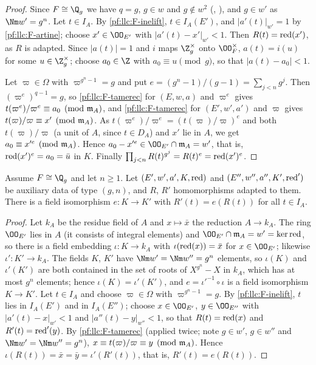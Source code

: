 \begin{proof}
Since $F\cong\Q_g$ we have $q=g$, $g\in w$ and $g\notin w^2$
(,
), and $g\in w'$ as $\Nm w'=g^n$. Let $t\in I_A$. By
\ref{pf:llc:F-inelift}, $t\in I_A(E')$, and $|a'(t)|_{w'}=1$ by \ref{pf:llc:F-artine}; choose
$x'\in\OO_{E'}$ with $|a'(t)-x'|_{w'}<1$. Then $R(t)=\operatorname{red}(x')$, as $R$ is adapted. Since $|a(t)|=1$ and $i$
maps $\Z_g^\times$ onto $\OO_F^\times$, $a(t)=i(u)$ for some $u\in\Z_g^\times$; choose $a_0\in\Z$ with $a_0\equiv
u\pmod g$, so that $|a(t)-a_0|<1$.

Let $\varpi\in\Omega$ with $\varpi^{g^n-1}=g$ and put $e=(g^n-1)/(g-1)=\sum_{j<n}g^j$. Then
$(\varpi^e)^{q-1}=g$, so \ref{pf:llc:F-tamerec} for $(E,w,a)$ and $\varpi^e$ gives
$t(\varpi^e)/\varpi^e\equiv a_0\pmod{\mathfrak m_A}$, and \ref{pf:llc:F-tamerec} for $(E',w',a')$ and $\varpi$ gives
$t(\varpi)/\varpi\equiv x'\pmod{\mathfrak m_A}$. As $t(\varpi^e)/\varpi^e=(t(\varpi)/\varpi)^e$ and both $t(\varpi)/\varpi$
(a unit of $A$, since $t\in D_A$) and $x'$ lie in $A$, we get $a_0\equiv x'^e\pmod{\mathfrak m_A}$. Hence
$a_0-x'^e\in\OO_{E'}\cap\llcm_A=w'$, that is, $\operatorname{red}(x')^e=a_0=\bar u$ in $K$. Finally
$\prod_{j<n}R(t)^{g^j}=R(t)^e=\operatorname{red}(x')^e$.
\end{proof}

\begin{lemma}\label{pf:llc:resindep}
Assume $F\cong\Q_g$ and let $n\ge1$. Let $(E',w',a',K,\operatorname{red})$ and $(E'',w'',a'',K',\operatorname{red}')$ be auxiliary
data of type $(g,n)$, and $R$, $R'$ homomorphisms adapted to them. There is a field isomorphism
$e\colon K\to K'$ with $R'(t)=e(R(t))$ for all $t\in I_A$. 
\end{lemma}

\begin{proof}
Let $k_A$ be the residue field of $A$ and $x\mapsto\bar x$ the reduction $A\to k_A$. The ring $\OO_{E'}$ lies in
$A$ (it consists of integral elements) and $\OO_{E'}\cap\llcm_A=w'=\ker\llcred$, so there is a field embedding
$\iota\colon K\to k_A$ with $\iota(\operatorname{red}(x))=\bar x$ for $x\in\OO_{E'}$; likewise $\iota'\colon K'\to k_A$. The
fields $K$, $K'$ have $\Nm w'=\Nm w''=g^n$ elements, so $\iota(K)$ and $\iota'(K')$ are both contained in the set
of roots of $X^{g^n}-X$ in $k_A$, which has at most $g^n$ elements; hence $\iota(K)=\iota'(K')$, and
$e=\iota'^{-1}\circ\iota$ is a field isomorphism $K\to K'$. Let $t\in I_A$ and choose $\varpi\in\Omega$ with
$\varpi^{g^n-1}=g$. By \ref{pf:llc:F-inelift}, $t$ lies in $I_A(E')$ and in $I_A(E'')$; choose $x\in\OO_{E'}$,
$y\in\OO_{E''}$ with $|a'(t)-x|_{w'}<1$ and $|a''(t)-y|_{w''}<1$, so that $R(t)=\operatorname{red}(x)$ and $R'(t)=\operatorname{red}'(y)$.
By \ref{pf:llc:F-tamerec} (applied twice; note $g\in w'$, $g\in w''$ and $\Nm w'=\Nm w''=g^n$),
$x\equiv t(\varpi)/\varpi\equiv y\pmod{\mathfrak m_A}$. Hence $\iota(R(t))=\bar x=\bar y=\iota'(R'(t))$, that is,
$R'(t)=e(R(t))$.
\end{proof}

